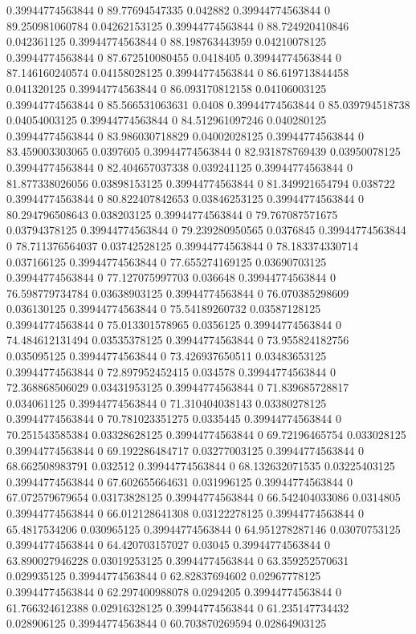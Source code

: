 0.39944774563844 0 89.77694547335 0.042882
0.39944774563844 0 89.250981060784 0.04262153125
0.39944774563844 0 88.724920410846 0.042361125
0.39944774563844 0 88.198763443959 0.04210078125
0.39944774563844 0 87.672510080455 0.0418405
0.39944774563844 0 87.146160240574 0.04158028125
0.39944774563844 0 86.619713844458 0.041320125
0.39944774563844 0 86.093170812158 0.04106003125
0.39944774563844 0 85.566531063631 0.0408
0.39944774563844 0 85.039794518738 0.04054003125
0.39944774563844 0 84.512961097246 0.040280125
0.39944774563844 0 83.986030718829 0.04002028125
0.39944774563844 0 83.459003303065 0.0397605
0.39944774563844 0 82.931878769439 0.03950078125
0.39944774563844 0 82.404657037338 0.039241125
0.39944774563844 0 81.877338026056 0.03898153125
0.39944774563844 0 81.349921654794 0.038722
0.39944774563844 0 80.822407842653 0.03846253125
0.39944774563844 0 80.294796508643 0.038203125
0.39944774563844 0 79.767087571675 0.03794378125
0.39944774563844 0 79.239280950565 0.0376845
0.39944774563844 0 78.711376564037 0.03742528125
0.39944774563844 0 78.183374330714 0.037166125
0.39944774563844 0 77.655274169125 0.03690703125
0.39944774563844 0 77.127075997703 0.036648
0.39944774563844 0 76.598779734784 0.03638903125
0.39944774563844 0 76.070385298609 0.036130125
0.39944774563844 0 75.54189260732 0.03587128125
0.39944774563844 0 75.013301578965 0.0356125
0.39944774563844 0 74.484612131494 0.03535378125
0.39944774563844 0 73.955824182756 0.035095125
0.39944774563844 0 73.426937650511 0.03483653125
0.39944774563844 0 72.897952452415 0.034578
0.39944774563844 0 72.368868506029 0.03431953125
0.39944774563844 0 71.839685728817 0.034061125
0.39944774563844 0 71.310404038143 0.03380278125
0.39944774563844 0 70.781023351275 0.0335445
0.39944774563844 0 70.251543585384 0.03328628125
0.39944774563844 0 69.72196465754 0.033028125
0.39944774563844 0 69.192286484717 0.03277003125
0.39944774563844 0 68.662508983791 0.032512
0.39944774563844 0 68.132632071535 0.03225403125
0.39944774563844 0 67.602655664631 0.031996125
0.39944774563844 0 67.072579679654 0.03173828125
0.39944774563844 0 66.542404033086 0.0314805
0.39944774563844 0 66.012128641308 0.03122278125
0.39944774563844 0 65.4817534206 0.030965125
0.39944774563844 0 64.951278287146 0.03070753125
0.39944774563844 0 64.420703157027 0.03045
0.39944774563844 0 63.890027946228 0.03019253125
0.39944774563844 0 63.359252570631 0.029935125
0.39944774563844 0 62.82837694602 0.02967778125
0.39944774563844 0 62.297400988078 0.0294205
0.39944774563844 0 61.766324612388 0.02916328125
0.39944774563844 0 61.235147734432 0.028906125
0.39944774563844 0 60.703870269594 0.02864903125
